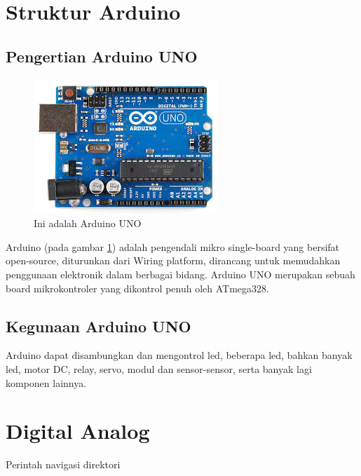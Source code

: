 \section{Struktur Arduino}
\subsection{Pengertian Arduino UNO}
\begin{figure}[!htbp]
  \centering
  \includegraphics[width=.75\textwidth]{figures/Arduino/arduinouno.jpg}
  \caption{Ini adalah Arduino UNO}\label{fig:arduinouno}
\end{figure}
Arduino (pada gambar \ref{fig:arduinouno}) adalah pengendali mikro single-board yang bersifat open-source, diturunkan dari Wiring platform, dirancang untuk memudahkan penggunaan elektronik dalam berbagai bidang. Arduino UNO merupakan sebuah board mikrokontroler yang dikontrol penuh oleh ATmega328.

\subsection{Kegunaan Arduino UNO}
Arduino dapat disambungkan dan mengontrol led, beberapa led, bahkan banyak led, motor DC, relay, servo, modul dan sensor-sensor, serta banyak lagi komponen lainnya.

\section{Digital Analog}
Perintah navigasi direktori

